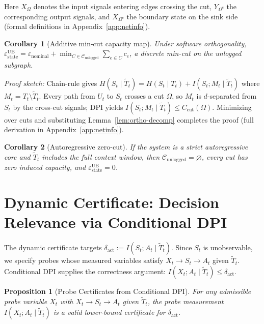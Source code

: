 \documentclass{article}
\newtheorem{proposition}{Proposition}
\newtheorem{corollary}{Corollary}
\begin{document}
  Here $X_\Omega$ denotes the input signals entering edges crossing the cut,
  $Y_{\Omega^c}$ the corresponding output signals, and $X_{\Omega^c}$ the
  boundary state on the sink side (formal definitions in
  Appendix~\ref{app:netinfo}).

  \begin{corollary}[Additive min-cut capacity map]
  \label{cor:additive-ub}
  Under software orthogonality, $\varepsilon_\text{state}^\text{UB} =
  \varepsilon_\text{nominal} + \min_{C \in \mathcal{C}_\text{unlogged}} \sum_{e
  \in C} c_e$, a discrete min-cut on the unlogged subgraph.
  \end{corollary}

  \emph{Proof sketch:} Chain-rule gives $H(S_t \mid \tilde T_t) = H(S_t \mid
  T_t) + I(S_t; M_t \mid \tilde T_t)$ where $M_t = T_t \setminus \tilde T_t$.
  Every path from $U_t$ to $S_t$ crosses a cut $\Omega$, so $M_t$ is
  $d$-separated from $S_t$ by the cross-cut signals; DPI yields $I(S_t; M_t \mid
   \tilde T_t) \leq C_\text{cut}(\Omega)$. Minimizing over cuts and substituting
   Lemma~\ref{lem:ortho-decomp} completes the proof (full derivation in
  Appendix~\ref{app:netinfo}).

  \begin{corollary}[Autoregressive zero-cut]
  \label{cor:auto-exact} 
  If the system is a strict autoregressive core and $\tilde T_t$ includes the
  full context window, then $\mathcal{C}_\text{unlogged} = \varnothing$, every
  cut has zero induced capacity, and $\varepsilon_\text{state}^\text{UB} = 0$.
  \end{corollary}

  \section{Dynamic Certificate: Decision Relevance via Conditional DPI}
  \label{sec:dynamic-cert}

  The dynamic certificate targets $\delta_\text{act} := I(S_t; A_t \mid \tilde
  T_t)$. Since $S_t$ is unobservable, we specify probes whose measured variables
   satisfy $X_t \to S_t \to A_t$ given $\tilde T_t$. Conditional DPI supplies
  the correctness argument: $I(X_t; A_t \mid \tilde T_t) \leq
  \delta_\text{act}$.

  \begin{proposition}[Probe Certificates from Conditional DPI]
  \label{prop:dynamic-lb}
  For any admissible probe variable $X_t$ with $X_t \to S_t \to A_t$ given
  $\tilde T_t$, the probe measurement $I(X_t; A_t \mid \tilde T_t)$ is a valid
  lower-bound certificate for $\delta_\text{act}$.
  \end{proposition}
\end{document}
